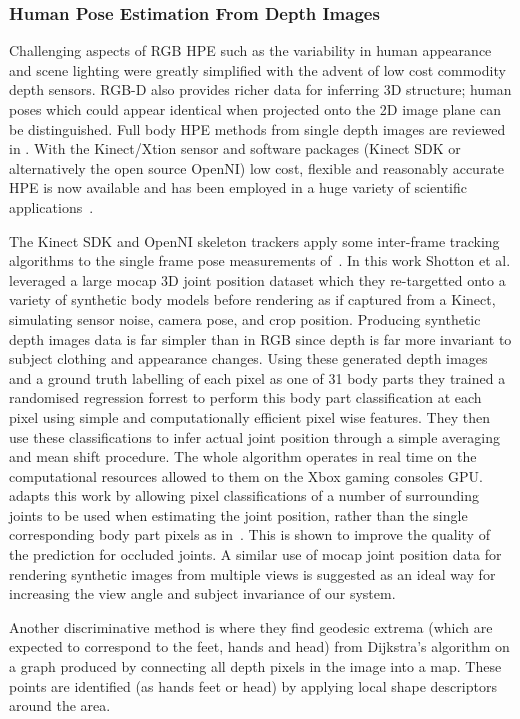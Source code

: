 \documentclass[11pt]{article} %
\begin{document}
\subsubsection{Human Pose Estimation From Depth Images}

Challenging aspects of RGB HPE such as the variability in human appearance and scene lighting were greatly simplified with the advent of low cost commodity depth sensors. RGB-D also provides richer data for inferring 3D structure; human poses which could appear identical when projected onto the 2D image plane can be distinguished. Full body HPE methods from single depth images are reviewed in \cite{Helten2013}. With the Kinect/Xtion sensor and software packages (Kinect SDK or alternatively the open source OpenNI) low cost, flexible and reasonably accurate HPE is now available and has been employed in a huge variety of scientific applications~\cite{Han2013,Giovanni}.

The Kinect SDK and OpenNI skeleton trackers apply some inter-frame tracking algorithms to the single frame pose measurements of~\cite{Shotton2011}. In this work Shotton et al. leveraged a large mocap 3D joint position dataset which they re-targetted onto a variety of synthetic body models before rendering as if captured from a Kinect, simulating sensor noise, camera pose, and crop position. Producing synthetic depth images data is far simpler than in RGB since depth is far more invariant to subject clothing and appearance changes. Using these generated depth images and a ground truth labelling of each pixel as one of 31 body parts they trained a randomised regression forrest to perform this body part classification at each pixel using simple and computationally efficient pixel wise features. They then use these classifications to infer actual joint position through a simple averaging and mean shift procedure. The whole algorithm operates in real time on the computational resources allowed to them on the Xbox gaming consoles GPU. \cite{Shotton2013a} adapts this work by allowing pixel classifications of a number of surrounding joints to be used when estimating the joint position, rather than the single corresponding body part pixels as in~\cite{Shotton2011}. This is shown to improve the quality of the prediction for occluded joints. A similar use of mocap joint position data for rendering synthetic images from multiple views is suggested as an ideal way for increasing the view angle and subject invariance of our system.

Another discriminative method is \cite{Plagemann2010} where they find geodesic extrema (which are expected to correspond to the feet, hands and head) from Dijkstra’s algorithm on a graph produced by connecting all depth pixels in the image into a map. These points are identified (as hands feet or head) by applying local shape descriptors around the area. 
\end{document}
